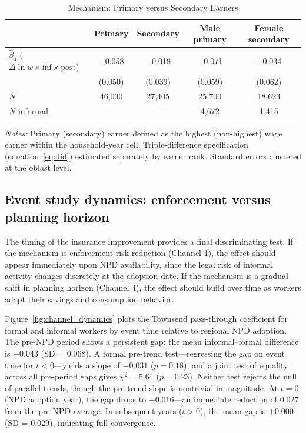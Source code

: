 \documentclass[12pt]{article}
\begin{document}
\begin{table}[htbp]
\centering
\caption{Mechanism: Primary versus Secondary Earners}
\label{tab:channel_earner}
\small
\begin{tabular}{lcccc}
\toprule
 & Primary & Secondary & Male primary & Female secondary \\
\midrule
$\hat{\beta}_4$ ($\Delta \ln w \times \text{inf} \times \text{post}$) & $-$0.058 & $-$0.018 & $-$0.071 & $-$0.034 \\
 & (0.050) & (0.039) & (0.059) & (0.062) \\[4pt]
$N$ & 46,030 & 27,405 & 25,700 & 18,623 \\
$N$ informal & --- & --- & 4,672 & 1,415 \\
\bottomrule
\end{tabular}
\begin{minipage}{0.9\textwidth}
\vspace{0.3em}
\footnotesize \textit{Notes:} Primary (secondary) earner defined as the highest (non-highest) wage earner within the household-year cell. Triple-difference specification (equation~\ref{eq:did}) estimated separately by earner rank. Standard errors clustered at the oblast level.
\end{minipage}
\end{table}

\subsection{Event study dynamics: enforcement versus planning horizon}

The timing of the insurance improvement provides a final discriminating test. If the mechanism is enforcement-risk reduction (Channel 1), the effect should appear immediately upon NPD availability, since the legal risk of informal activity changes discretely at the adoption date. If the mechanism is a gradual shift in planning horizon (Channel 4), the effect should build over time as workers adapt their savings and consumption behavior.

Figure~\ref{fig:channel_dynamics} plots the Townsend pass-through coefficient for formal and informal workers by event time relative to regional NPD adoption. The pre-NPD period shows a persistent gap: the mean informal--formal difference is $+0.043$ (SD = 0.068). A formal pre-trend test---regressing the gap on event time for $t < 0$---yields a slope of $-0.031$ ($p = 0.18$), and a joint test of equality across all pre-period gaps gives $\chi^2 = 5.64$ ($p = 0.23$). Neither test rejects the null of parallel trends, though the pre-trend slope is nontrivial in magnitude. At $t = 0$ (NPD adoption year), the gap drops to $+0.016$---an immediate reduction of $0.027$ from the pre-NPD average. In subsequent years ($t > 0$), the mean gap is $+0.000$ (SD = 0.029), indicating full convergence.
\end{document}
